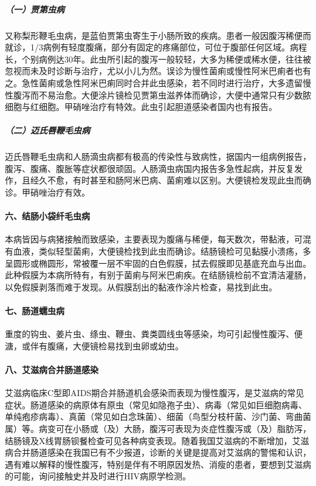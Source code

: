 \subparagraph{（一）贾第虫病}

又称梨形鞭毛虫病，是蓝伯贾第虫寄生于小肠所致的疾病。患者一般因腹泻稀便而就诊，1/3病例有轻度腹痛，部分有固定的疼痛部位，可位于腹部任何区域。病程长，个别病例达30年。此虫所引起的腹泻一般较轻，大多为稀便或稀水便，往往被忽视而未及时诊断与治疗，尤以小儿为然。误诊为慢性菌痢或慢性阿米巴痢者也有之。急性菌痢或急性阿米巴痢同时合并此虫感染，若不同时进行治疗，大多遗留慢性腹泻而不易治愈。大便涂片镜检见贾第虫滋养体而确诊，大便中通常只有少数脓细胞与红细胞。甲硝唑治疗有特效。此虫引起胆道感染者国内也有报告。

\subparagraph{（二）迈氏唇鞭毛虫病}

迈氏唇鞭毛虫病和人肠滴虫病都有极高的传染性与致病性，据国内一组病例报告，腹泻、腹痛、腹胀等症状都很顽固。人肠滴虫病国内报告多急性起病，并反复发作，且经久不愈，有时甚至和肠阿米巴病、菌痢难以区别。大便镜检发现此虫而确诊。甲硝唑治疗有效。

\paragraph{六、结肠小袋纤毛虫病}

本病皆因与病猪接触而致感染，主要表现为腹痛与稀便，每天数次，带黏液，可混有血液，类似轻型菌痢，大便镜检找到此虫而确诊。结肠镜检可见黏膜小溃疡，多呈圆形或椭圆形，常被覆一层不牢固的白色假膜，拭去假膜即见基底充血与出血。此种假膜为本病所特有，有别于菌痢与阿米巴痢疾。在结肠镜检前不宜清洁灌肠，以免假膜剥落而难于发现。从假膜刮出的黏液作涂片检查，易找到此虫。

\paragraph{七、肠道蠕虫病}

重度的钩虫、姜片虫、绦虫、鞭虫、粪类圆线虫等感染，均可引起慢性腹泻、便溏，或伴有腹痛，大便镜检易找到虫卵或幼虫。

\paragraph{八、艾滋病合并肠道感染}

艾滋病临床C型即AIDS期合并肠道机会感染而表现为慢性腹泻，是艾滋病的常见症状。肠道感染的病原体有原虫（常见如隐孢子虫）、病毒（常见如巨细胞病毒、单纯疱疹病毒）、真菌（常见如白念珠菌）、细菌（鸟型分枝杆菌、沙门菌、弯曲菌属）等。病变可在小肠或（及）大肠，腹泻可表现为炎症性腹泻或（及）脂肪泻，结肠镜及X线胃肠钡餐检查可见各种病变表现。随着我国艾滋病的不断增加，艾滋病合并肠道感染在我国已有不少报道，诊断的关键是提高对艾滋病的警惕和认识，遇有难以解释的慢性腹泻，特别是伴有不明原因发热、消瘦的患者，要想到艾滋病的可能，询问接触史并及时进行HIV病原学检测。

